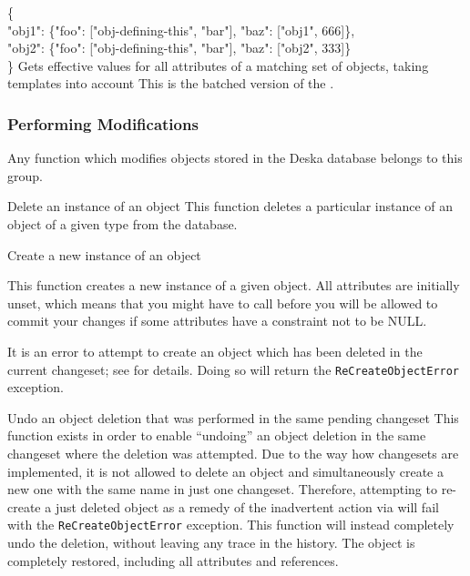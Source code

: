 \documentclass{article}
\begin{document}
    { \{ \\
        "obj1": \{"foo": ["obj-defining-this", "bar"], "baz": ["obj1", 666]\}, \\ 
        "obj2": \{"foo": ["obj-defining-this", "bar"], "baz": ["obj2", 333]\} \\ 
      \} }
    {Gets effective values for all attributes of a matching set of objects, taking templates into account}
    {This is the batched version of the .  \deskaUnsortedRes}

\subsubsection{Performing Modifications}
\label{sec:api-group-data-modification}

Any function which modifies objects stored in the Deska database belongs to this group.

    {}
    {Delete an instance of an object}
    {This function deletes a particular instance of an object of a given type from the database.}

    {}
    {Create a new instance of an object}
    {This function creates a new instance of a given object.  All attributes are initially unset, which means that you
    might have to call  before you will be allowed to commit your changes if some attributes
    have a constraint not to be NULL.

    It is an error to attempt to create an object which has been deleted in the current changeset; see
     for details.  Doing so will return the {\tt ReCreateObjectError} exception.}

    {}
    {Undo an object deletion that was performed in the same pending changeset}
    {This function exists in order to enable ``undoing'' an object deletion in the same changeset where the deletion was
    attempted.  Due to the way how changesets are implemented, it is not allowed to delete an object and simultaneously
    create a new one with the same name in just one changeset.  Therefore, attempting to re-create a just deleted object
    as a remedy of the inadvertent action via  will fail with the {\tt ReCreateObjectError}
    exception.  This function will instead completely undo the deletion, without leaving any trace in the history.  The
    object is completely restored, including all attributes and references.}
\end{document}
